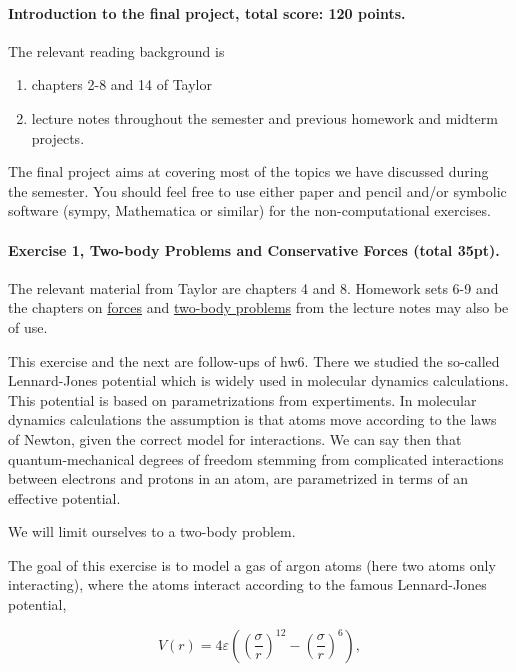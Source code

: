 \documentclass[%
oneside,                 %
final,                   %
10pt]{article}
\begin{document}
\noindent
\paragraph{Introduction to the final project, total score: 120  points.}
The relevant reading background is
\begin{enumerate}
\item chapters 2-8 and 14 of Taylor

\item lecture notes throughout the semester and previous homework and midterm projects.
\end{enumerate}

\noindent
The final project aims at covering most of the topics we have
discussed during the semester. You should feel free to use either
paper and pencil and/or symbolic software (sympy, Mathematica or
similar) for the non-computational exercises.


\paragraph{Exercise 1, Two-body Problems and Conservative Forces (total 35pt).}
The relevant material from Taylor are chapters 4 and 8. Homework sets 6-9 and the chapters on \href{{https://mhjensen.github.io/Physics321/doc/LectureNotes/_build/html/chapter4.html}}{forces} and \href{{https://mhjensen.github.io/Physics321/doc/LectureNotes/_build/html/chapter6.html}}{two-body problems} from the lecture notes may also be of use. 

This exercise and the next are  follow-ups of hw6. There we studied the so-called
Lennard-Jones potential which is widely used in molecular dynamics
calculations. This potential is based on parametrizations from
expertiments. In molecular dynamics calculations the assumption is
that atoms move according to the laws of Newton, given the correct
model for interactions. We can say then that quantum-mechanical
degrees of freedom stemming from complicated interactions between electrons
and protons in an atom, are parametrized in terms of an effective
potential.

We will limit ourselves to a two-body problem.

The goal of this exercise is to model a gas of argon atoms (here two
atoms only interacting), where the atoms interact according to the
famous Lennard-Jones potential,

\begin{equation}
    V(r) = 4\varepsilon\left((\frac{\sigma}{r})^{12} - (\frac{\sigma}{r})^6\right), \label{eq:lj}
\end{equation}
\end{document}
